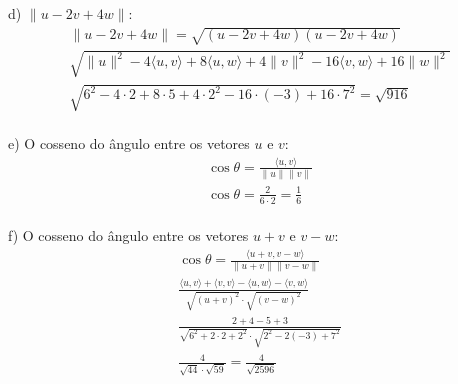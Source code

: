 d) $\|u - 2v + 4w\|$:
\\
\[
    \begin{split}
        \|u - 2v + 4w\| = \sqrt{(u - 2v + 4w)(u - 2v + 4w)}\\
        \sqrt{\|u\|^2-4\langle u,v\rangle + 8\langle u,w\rangle + 4\|v\|^2 - 16\langle v,w\rangle + 16\|w\|^2}\\
        \sqrt{6^2-4\cdot2+8\cdot5+4\cdot2^2-16\cdot(-3)+16\cdot7^2} = \sqrt{916}
    \end{split}
\]
\\

e) O cosseno do ângulo entre os vetores $u$ e $v$:
\\
\[
    \begin{split}
        \cos\theta = \frac{\langle u,v\rangle}{\|u\|\|v\|}\\
        \cos\theta = \frac{2}{6\cdot2} = \frac{1}{6}
    \end{split}
\]
\\

f) O cosseno do ângulo entre os vetores $u + v$ e $v - w$:
\\
\[
    \begin{split}
        \cos\theta = \frac{\langle u + v,v - w\rangle}{\|u + v\|\|v - w\|}\\
        \frac{\langle u, v\rangle + \langle v,v\rangle - \langle u,w\rangle-\langle v,w\rangle}{\sqrt{(u+v)^2}\cdot \sqrt{(v-w)^2}}\\
        \frac{2+4-5+3}{\sqrt{6^2+2\cdot 2+2^2}\cdot \sqrt{2^2-2(-3)+7^2}}\\
        \frac{4}{\sqrt{44}\cdot \sqrt{59}} = \frac{4}{\sqrt{2596}}
    \end{split}
\]